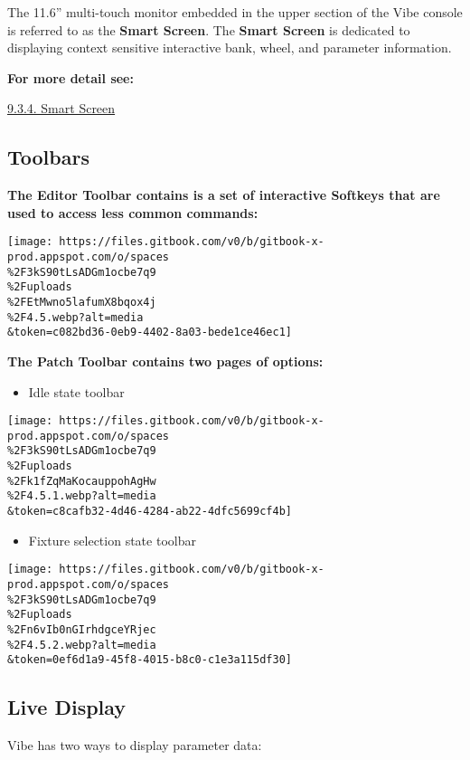 \documentclass[
]{article}
\providecommand{\tightlist}{%
  \setlength{\itemsep}{0pt}\setlength{\parskip}{0pt}}
\begin{document}
The 11.6'' multi-touch monitor embedded in the upper section of the Vibe console is referred to as the \textbf{Smart Screen}. The \textbf{Smart Screen} is dedicated to displaying context sensitive interactive bank, wheel, and parameter information.

\textbf{For more detail see:}

\href{https://compulite2021.github.io/Vibe-Guide/programming-basics.html\#smart-screen-1}{9.3.4. Smart Screen}

\hypertarget{toolbars}{%
\subsection{Toolbars}\label{toolbars}}

\textbf{The Editor Toolbar contains is a set of interactive Softkeys that are used to access less common commands:}

\texttt{[image: https://files.gitbook.com/v0/b/gitbook-x-prod.appspot.com/o/spaces\\\%2F3kS90tLsADGm1ocbe7q9\\\%2Fuploads\\\%2FEtMwno5lafumX8bqox4j\\\%2F4.5.webp?alt=media\\\&token=c082bd36-0eb9-4402-8a03-bede1ce46ec1]}

\textbf{The Patch Toolbar contains two pages of options:}

\begin{itemize}
\tightlist
\item
  Idle state toolbar
\end{itemize}

\texttt{[image: https://files.gitbook.com/v0/b/gitbook-x-prod.appspot.com/o/spaces\\\%2F3kS90tLsADGm1ocbe7q9\\\%2Fuploads\\\%2Fk1fZqMaKocauppohAgHw\\\%2F4.5.1.webp?alt=media\\\&token=c8cafb32-4d46-4284-ab22-4dfc5699cf4b]}

\begin{itemize}
\tightlist
\item
  Fixture selection state toolbar
\end{itemize}

\texttt{[image: https://files.gitbook.com/v0/b/gitbook-x-prod.appspot.com/o/spaces\\\%2F3kS90tLsADGm1ocbe7q9\\\%2Fuploads\\\%2Fn6vIb0nGIrhdgceYRjec\\\%2F4.5.2.webp?alt=media\\\&token=0ef6d1a9-45f8-4015-b8c0-c1e3a115df30]}

\hypertarget{live-display}{%
\subsection{Live Display}\label{live-display}}

Vibe has two ways to display parameter data:
\end{document}
